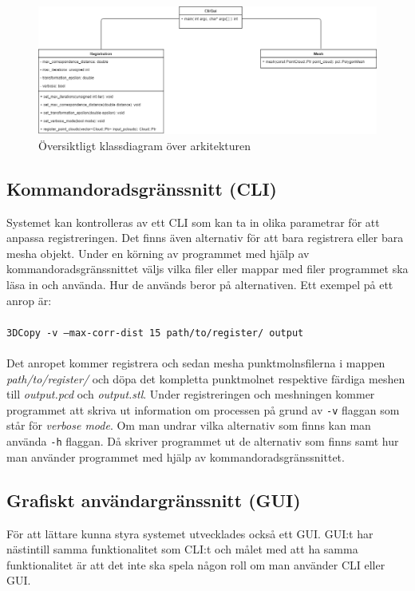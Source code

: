 \begin{figure}[H]
	\centering
	\includegraphics[width=130mm]{figures/klassdiagram.png}
	\caption{Översiktligt klassdiagram över arkitekturen}
	\label{fig:class_diagram}
\end{figure}

\subsection{Kommandoradsgränssnitt (CLI)}

Systemet kan kontrolleras av ett CLI som kan ta in olika parametrar för att anpassa registreringen. Det finns även alternativ för att bara registrera eller bara mesha objekt. Under en körning av programmet med hjälp av kommandoradsgränssnittet väljs vilka filer eller mappar med filer programmet ska läsa in och använda. Hur de används beror på alternativen. Ett exempel på ett anrop är:\\\\
\texttt{3DCopy -v --max-corr-dist 15 path/to/register/ output}\\\\
Det anropet kommer registrera och sedan mesha punktmolnsfilerna i mappen \textit{path/to/register/} och döpa det kompletta punktmolnet respektive färdiga meshen till \textit{output.pcd} och \textit{output.stl}. Under registreringen och meshningen kommer programmet att skriva ut information om processen på grund av \texttt{-v} flaggan som står för \textit{verbose mode}. Om man undrar vilka alternativ som finns kan man använda \texttt{-h} flaggan. Då skriver programmet ut de alternativ som finns samt hur man använder programmet med hjälp av kommandoradsgränssnittet. 

\subsection{Grafiskt användargränssnitt (GUI)}
För att lättare kunna styra systemet utvecklades också ett GUI. GUI:t har nästintill samma funktionalitet som CLI:t och målet med att ha samma funktionalitet är att det inte ska spela någon roll om man använder CLI eller GUI.

